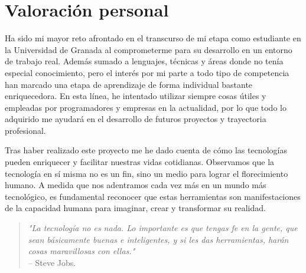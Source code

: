  \section{Valoración personal}

 Ha sido mi mayor reto afrontado en el transcurso de mi etapa como estudiante en la Universidad de Granada al comprometerme para su desarrollo en un entorno de trabajo real. Además sumado a lenguajes, técnicas y áreas donde no tenía especial conocimiento, pero el interés por mi parte a todo tipo de competencia han marcado una etapa de aprendizaje de forma individual bastante enriquecedora. En esta línea, he intentado utilizar siempre cosas útiles y empleadas por programadores y empresas en la actualidad, por lo que todo lo adquirido me ayudará en el desarrollo de futuros proyectos y trayectoria profesional.

 Tras haber realizado este proyecto me he dado cuenta de cómo las tecnologías pueden enriquecer y facilitar nuestras vidas cotidianas. Observamos que la tecnología en sí misma no es un fin, sino un medio para lograr el florecimiento humano. A medida que nos adentramos cada vez más en un mundo más tecnológico, es fundamental reconocer que estas herramientas son manifestaciones de la capacidad humana para imaginar, crear y transformar su realidad. 

\begin{quote}
    \textit{"La tecnología no es nada. Lo importante es que tengas fe en la gente, que sean básicamente buenas e inteligentes, y si les das herramientas, harán cosas maravillosas con ellas."} \\ 
    -- Steve Jobs.
\end{quote}
